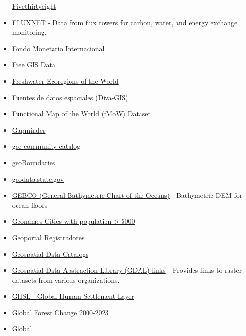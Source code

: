 \documentclass[
]{article}
\begin{document}
\begin{itemize}
  \href{https://data.fivethirtyeight.com/}{Fivethirtyeight}
\item
  \href{https://fluxnet.org/}{FLUXNET} - Data from flux towers for
  carbon, water, and energy exchange monitoring.
\item
  \href{http://www.imf.org/en/data}{Fondo Monetario Internacional}
\item
  \href{http://freegisdata.rtwilson.com/}{Free GIS Data}
\item
  \href{https://www.worldwildlife.org/pages/freshwater-ecoregions-of-the-world--2}{Freshwater
  Ecoregions of the World}
\item
  \href{https://diva-gis.org/}{Fuentes de datos espaciales (Diva-GIS)}
\item
  \href{https://github.com/fMoW/dataset}{Functional Map of the World
  (fMoW) Dataset}
\item
  \href{https://www.gapminder.org/data/}{Gapminder}
\item
  \href{https://gee-community-catalog.org/}{gee-community-catalog}
\item
  \href{https://www.geoboundaries.org/}{geoBoundaries}
\item
  \href{https://geodata.state.gov/geonetwork/srv/spa/catalog.search\#/home}{geodata.state.gov}
\item
  \href{https://www.gebco.net/}{GEBCO (General Bathymetric Chart of the
  Oceans)} - Bathymetric DEM for ocean floors
\item
  \href{https://documentation-resources.opendatasoft.com/explore/dataset/doc-geonames-cities-5000/table/}{Geonames
  Cities with population \textgreater{} 5000}
\item
  \href{https://geoportal.registradores.org/}{Geoportal Registradores}
\item
  \href{https://github.com/opengeos/geospatial-data-catalogs}{Geospatial
  Data Catalogs}
\item
  \href{https://gdal.org/en/stable/}{Geospatial Data Abstraction Library
  (GDAL) links} - Provides links to raster datasets from various
  organizations.
\item
  \href{https://human-settlement.emergency.copernicus.eu/download.php?ds=bu}{GHSL
  - Global Human Settlement Layer}
\item
  \href{https://storage.googleapis.com/earthenginepartners-hansen/GFC-2023-v1.11/download.html}{Global
  Forest Change 2000-2023}
\item
  \href{https://developers.google.com/earth-engine/datasets/catalog/GLOBAL_FLOOD_DB_MODIS_EVENTS_V1}{Global
}
\end{itemize}
\end{document}
